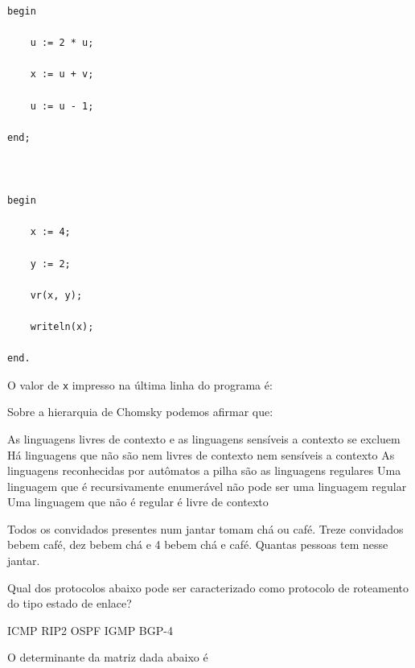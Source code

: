 \documentclass[12pt, addpoints]{exam}
\begin{document}
\begin{questions}
\begin{verbatim}
begin

    u := 2 * u;

    x := u + v;

    u := u - 1;

end;



begin

    x := 4;

    y := 2;

    vr(x, y);

    writeln(x);

end.

\end{verbatim}



O valor de \texttt{x} impresso na última linha do programa é:
\begin{choices}
\end{choices}

\question

Sobre a hierarquia de Chomsky podemos afirmar que:
\begin{choices}
\choice As linguagens livres de contexto e as linguagens sensíveis a contexto se excluem
\choice Há linguagens que não são nem livres de contexto nem sensíveis a contexto
\choice As linguagens reconhecidas por autômatos a pilha são as linguagens regulares
\choice Uma linguagem que é recursivamente enumerável não pode ser uma linguagem regular
\choice Uma linguagem que não é regular é livre de contexto
\end{choices}

\question

Todos os convidados presentes num jantar tomam chá ou café. Treze convidados bebem café, dez bebem chá e 4 bebem chá e café. Quantas pessoas tem nesse jantar.


\begin{choices}
\end{choices}

\question

Qual dos protocolos abaixo pode ser caracterizado como protocolo de roteamento do tipo estado de enlace?
\begin{choices}
\choice ICMP
\choice RIP2
\choice OSPF
\choice IGMP
\choice BGP-4
\end{choices}

\question

O determinante da matriz dada abaixo é


\end{questions}
\end{document}
